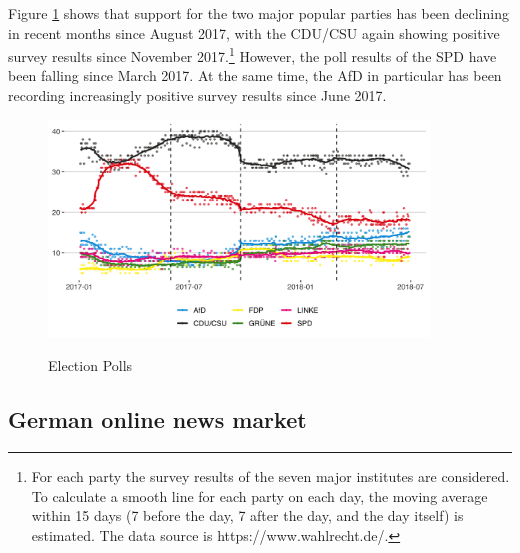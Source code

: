 \documentclass[12pt,a4paper,notitlepage]{article}
\begin{document}
Figure \ref{fig_polls} shows that support for the two major popular parties has been declining in recent months since August 2017, with the CDU/CSU again showing positive survey results since November 2017.\footnote{For each party the survey results of the seven major institutes are considered. To calculate a smooth line for each party on each day, the moving average within 15 days (7 before the day, 7 after the day, and the day itself) is estimated. The data source is https://www.wahlrecht.de/.} However, the poll results of the SPD have been falling since March 2017. At the same time, the AfD in particular has been recording increasingly positive survey results since June 2017.  

\begin{figure}[H]
\begin{center}
	\caption{Election Polls}
	\includegraphics[width=0.9\textwidth]{../figs/polldata}
	\label{fig_polls}
	\end{center}
\end{figure}

\subsection{German online news market}
\end{document}
